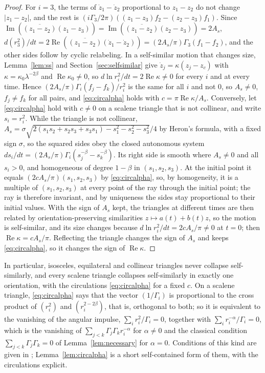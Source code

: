 \documentclass[11pt]{article}
\theoremstyle{definition}
\newcommand{\re}{\operatorname{Re}}
\newcommand{\im}{\operatorname{Im}}
\begin{document}
\begin{proof}
For $i = 3$, the terms of $\dot z_1 - \dot z_2$ proportional to $z_1 - z_2$ do not change $|z_1 - z_2|$, and the rest is $(i\Gamma_3/2\pi)((z_1 - z_3) f_2 - (z_2 - z_3) f_1)$. Since $\im(\overline{(z_1 - z_2)}(z_1 - z_3)) = \im(\overline{(z_1 - z_2)}(z_2 - z_3)) = 2A_s$, $d(r_3^2)/dt = 2\re(\overline{(z_1 - z_2)}(\dot z_1 - \dot z_2)) = (2A_s/\pi)\Gamma_3(f_1 - f_2)$, and the other sides follow by cyclic relabeling. In a self-similar motion that changes size, Lemma~\ref{lem:ss} and Section~\ref{sec:selfsimilar} give $\dot z_j = \kappa(z_j - z_c)$ with $\kappa = \kappa_0\lambda^{-2\beta}$ and $\re\kappa_0 \ne 0$, so $d\ln r_i^2/dt = 2\re\kappa \ne 0$ for every $i$ and at every time. Hence $(2A_s/\pi)\Gamma_i(f_j - f_k)/r_i^2$ is the same for all $i$ and not $0$, so $A_s \ne 0$, $f_j \ne f_k$ for all pairs, and \eqref{eq:circalpha} holds with $c = \pi\re\kappa/A_s$. Conversely, let \eqref{eq:circalpha} hold with $c \ne 0$ on a scalene triangle that is not collinear, and write $s_i = r_i^2$. While the triangle is not collinear, $A_s = \sigma\sqrt{2(s_1s_2 + s_2s_3 + s_3s_1) - s_1^2 - s_2^2 - s_3^2}/4$ by Heron's formula, with a fixed sign $\sigma$, so the squared sides obey the closed autonomous system $ds_i/dt = (2A_s/\pi)\Gamma_i(s_j^{-\beta} - s_k^{-\beta})$. Its right side is smooth where $A_s \ne 0$ and all $s_i > 0$, and homogeneous of degree $1 - \beta$ in $(s_1, s_2, s_3)$. At the initial point it equals $(2cA_s/\pi)(s_1, s_2, s_3)$ by \eqref{eq:circalpha}, so, by homogeneity, it is a multiple of $(s_1, s_2, s_3)$ at every point of the ray through the initial point; the ray is therefore invariant, and by uniqueness the sides stay proportional to their initial values. With the sign of $A_s$ kept, the triangles at different times are then related by orientation-preserving similarities $z \mapsto a(t) + b(t)z$, so the motion is self-similar, and its size changes because $d\ln r_i^2/dt = 2cA_s/\pi \ne 0$ at $t = 0$; then $\re\kappa = cA_s/\pi$. Reflecting the triangle changes the sign of $A_s$ and keeps \eqref{eq:circalpha}, so it changes the sign of $\re\kappa$.
\end{proof}

In particular, isosceles, equilateral and collinear triangles never collapse self-similarly, and every scalene triangle collapses self-similarly in exactly one orientation, with the circulations \eqref{eq:circalpha} for a fixed $c$. On a scalene triangle, \eqref{eq:circalpha} says that the vector $(1/\Gamma_i)$ is proportional to the cross product of $(r_i^2)$ and $(r_i^{2 - 2\beta})$, that is, orthogonal to both; so it is equivalent to the vanishing of the angular impulse, $\sum_i r_i^2/\Gamma_i = 0$, together with $\sum_i r_i^{-\alpha}/\Gamma_i = 0$, which is the vanishing of $\sum_{j<k}\Gamma_j\Gamma_k r_i^{-\alpha}$ for $\alpha \ne 0$ and the classical condition $\sum_{j<k}\Gamma_j\Gamma_k = 0$ of Lemma~\ref{lem:necessary} for $\alpha = 0$. Conditions of this kind are given in \cite{bb2018,cl2024,gp2025,rds2022,yoi2021}; Lemma~\ref{lem:circalpha} is a short self-contained form of them, with the circulations explicit.
\end{document}
